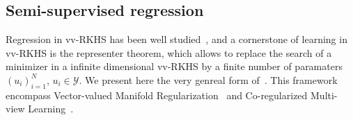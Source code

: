 \subsection{Semi-supervised regression}
Regression in \acl{vv-RKHS} has been well studied~\citep{Alvarez2012,
Minh_icml13,minh2016unifying,sangnier2016joint,kadri2015operator,Micchelli2005,
Brouard2016_jmlr}, and a cornerstone of learning in \acs{vv-RKHS} is the
representer theorem, which allows to replace the search of a minimizer in a infinite
dimensional \acs{vv-RKHS} by a finite number of paramaters $(u_i)_{i=1}^N$,
$u_i\in\mathcal{Y}$. We present here the very genreal form
of~\citet{minh2016unifying}. This framework encompass Vector-valued Manifold
Regularization~\citep{belkin2006manifold,Brouard2011,minh2013unifying} and
Co-regularized Multi-view
Learning~\citep{brefeld2006efficient,sindhwani2008rkhs,rosenberg2009kernel,
sun2011multi}.
